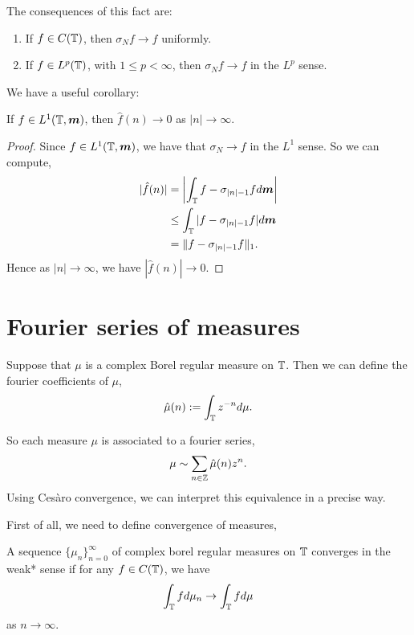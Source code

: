 \documentclass{owmaths}
\begin{document}
The consequences of this fact are:
\begin{enumerate}
    \item{} If $f \in C(\mathbb{T})$, then $\sigma_N f\rightarrow f$
    uniformly.
    \item{} If $f \in L^p(\mathbb{T})$, with $1 \leq p < \infty$, then 
    $\sigma_N f \rightarrow f$ in the $L^p$ sense.
\end{enumerate}

We have a useful corollary:
\begin{corollary}
    If $f \in L^1(\mathbb{T},\boldsymbol{m})$, then $\hat{f}(n)\rightarrow 0$
    as $|n|\rightarrow \infty$. 
\end{corollary}
\begin{proof}
    Since $f \in L^1(\mathbb{T},\boldsymbol{m})$, we have that $\sigma_N\rightarrow f$
    in the $L^1$ sense. So we can compute,
    \begin{align*}
        |\hat{f}(n)| &= \left|\int_{\mathbb{T}} f-\sigma_{|n|-1}f d\boldsymbol{m}\right|\\
        &\leq \int_{\mathbb{T}} |f-\sigma_{|n|-1}f|d\boldsymbol{m}\\
        &= \|f-\sigma_{|n|-1}f\|_1.
    \end{align*}
    Hence as $|n|\rightarrow\infty$, we have $|\hat{f}(n)|\rightarrow 0$.
\end{proof}

\section{Fourier series of measures}

Suppose that $\mu$ is a complex Borel regular measure on $\mathbb{T}$. Then 
we can define the fourier coefficients of $\mu$,
\begin{equation*}
    \hat{\mu}(n) := \int_{\mathbb{T}} z^{-n} d\mu.
\end{equation*}

So each measure $\mu$ is associated to a fourier series,
\begin{equation*}
    \mu \sim \sum_{n \in \mathbb{Z}} \hat{\mu}(n)z^n.
\end{equation*}
Using Ces\`aro convergence, we can interpret this equivalence in a precise way.

First of all, we need to define convergence of measures,
\begin{definition}
    A sequence $\{\mu_n\}_{n=0}^\infty$ of complex borel regular measures
    on $\mathbb{T}$ converges in the weak* sense if for any $f \in C(\mathbb{T})$, we have
    \begin{equation*}
        \int_{\mathbb{T}} fd\mu_n \rightarrow \int_{\mathbb{T}} fd\mu
    \end{equation*}
    as $n\rightarrow\infty$.
\end{definition}
\end{document}
